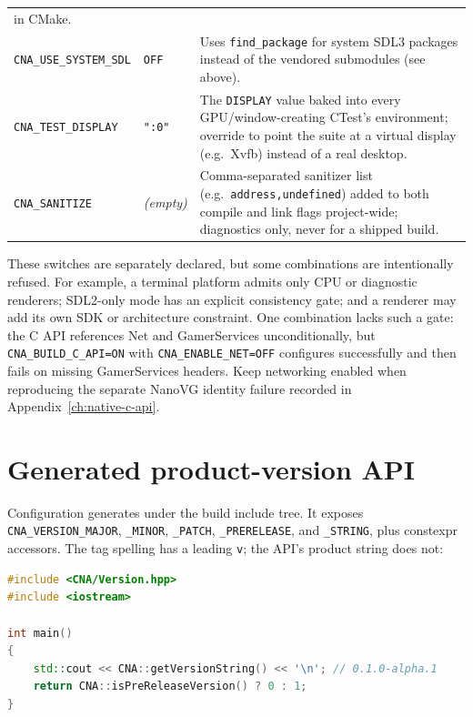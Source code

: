 \begin{center}
\begin{tabularx}{\textwidth}{llX}
  in CMake. \\
\texttt{CNA\_USE\_SYSTEM\_SDL} & \texttt{OFF} & Uses \texttt{find\_package} for system SDL3
  packages instead of the vendored submodules (see above). \\
\texttt{CNA\_TEST\_DISPLAY} & \texttt{":0"} & The \texttt{DISPLAY} value baked into every
  GPU/window-creating CTest's environment; override to point the suite at a virtual display
  (e.g.\ Xvfb) instead of a real desktop. \\
\texttt{CNA\_SANITIZE} & \emph{(empty)} & Comma-separated sanitizer list (e.g.\
  \texttt{address,undefined}) added to both compile and link flags project-wide; diagnostics
  only, never for a shipped build. \\
\bottomrule
\end{tabularx}
\end{center}

These switches are separately declared, but some combinations are intentionally refused. For
example, a terminal platform admits only CPU or diagnostic renderers; SDL2-only mode has an
explicit consistency gate; and a renderer may add its own SDK or architecture constraint. One
combination lacks such a gate: the C API references Net and GamerServices unconditionally, but
\texttt{CNA\_BUILD\_C\_API=ON} with \texttt{CNA\_ENABLE\_NET=OFF} configures successfully and
then fails on missing GamerServices headers. Keep networking enabled when reproducing the separate
NanoVG identity failure recorded in Appendix~\ref{ch:native-c-api}.

\section{Generated product-version API}

Configuration generates  under the build include tree. It exposes
\texttt{CNA\_VERSION\_MAJOR}, \texttt{\_MINOR}, \texttt{\_PATCH},
\texttt{\_PRERELEASE}, and \texttt{\_STRING}, plus constexpr accessors. The tag spelling has a
leading \texttt{v}; the API's product string does not:

\begin{lstlisting}[language=C++]
#include <CNA/Version.hpp>
#include <iostream>

int main()
{
    std::cout << CNA::getVersionString() << '\n'; // 0.1.0-alpha.1
    return CNA::isPreReleaseVersion() ? 0 : 1;
}
\end{lstlisting}

